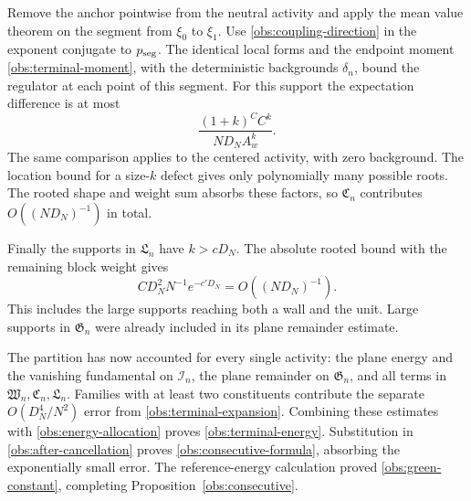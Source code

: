 Remove the anchor pointwise from the neutral activity and apply the
mean value theorem on the segment from \(\xi_0\) to \(\xi_1\).
Use \eqref{obs:coupling-direction} in the exponent conjugate to
\(p_{\rm seg}\).  The identical local forms and the endpoint moment
\eqref{obs:terminal-moment}, with the deterministic backgrounds
\(\delta_n\), bound the regulator at each point of this segment.
For this support the expectation difference is at most
\[
                         \frac{(1+k)^C C^k}{ND_NA_w^k}.
\]
The same comparison applies to the centered activity, with zero
background.  The location bound for a size-\(k\) defect gives only
polynomially many possible roots.  The rooted shape and weight sum
absorbs these factors, so \(\mathfrak C_n\) contributes
\(O((ND_N)^{-1})\) in total.

Finally the supports in \(\mathfrak L_n\) have \(k>cD_N\).  The
absolute rooted bound with the remaining block weight gives
\[
               C D_N^2N^{-1}e^{-c'D_N}=O((ND_N)^{-1}).
\]
This includes the large supports reaching both a wall and the
unit.  Large supports in \(\mathfrak G_n\) were already included
in its plane remainder estimate.

The partition has now accounted for every single activity: the
plane energy and the vanishing fundamental on \(\mathcal I_n\),
the plane remainder on \(\mathfrak G_n\), and all terms in
\(\mathfrak W_n,\mathfrak C_n,\mathfrak L_n\).  Families with at least
two constituents contribute the separate \(O(D_N^4/N^2)\) error
from \eqref{obs:terminal-expansion}.  Combining these estimates
with \eqref{obs:energy-allocation} proves
\eqref{obs:terminal-energy}.  Substitution in
\eqref{obs:after-cancellation} proves
\eqref{obs:consecutive-formula}, absorbing the exponentially small
error.  The reference-energy calculation proved
\eqref{obs:green-constant}, completing Proposition~\ref{obs:consecutive}.
